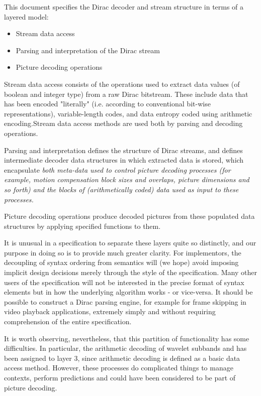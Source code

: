 This document specifies the Dirac decoder and stream structure in terms of
a layered model:

\begin{itemize}
    \item Stream data access
    \item Parsing and interpretation of the Dirac stream
    \item Picture decoding operations
\end{itemize}

Stream data access consists of the operations used to extract data values
(of boolean and integer type) from a raw Dirac bitstream. These include
data that has been encoded "literally" (i.e. according to conventional bit-wise
representations), variable-length codes, and data entropy coded using arithmetic
encoding.Stream data access methods are used both by parsing and decoding operations.

Parsing and interpretation defines the structure of Dirac streams, and defines
intermediate decoder data structures in which extracted data is stored, which 
encapsulate \em{both} meta-data used to control picture decoding processes (for 
example, motion compensation block sizes and overlaps, picture dimensions and
so forth) \em{and} the blocks of (arithmetically coded) data used as input to 
these processes.

Picture decoding operations produce decoded pictures from these populated
data structures by applying specified functions to them. 

It is unusual in a specification to separate these layers quite so distinctly, 
and our purpose in doing so is to provide much greater clarity. For implementors,
the decoupling of syntax ordering from semantics will (we hope) avoid imposing
implicit design decisions merely through the style of the specification. Many
other users of the specification will not be interested in the precise format
of syntax elements but in how the underlying algorithm works - or vice-versa.
It should be possible to construct a Dirac parsing engine, for example for
frame skipping in video playback applications, extremely simply and without
requiring comprehension of the entire specification.

It is worth observing, nevertheless, that this partition of functionality has 
some difficulties. In particular, the arithmetic decoding of wavelet subbands and 
has been assigned to layer 3, since arithmetic
decoding is defined as a basic data access method. However, these processes
do complicated things to manage contexts, perform predictions
and could have been considered to be part of picture decoding.

